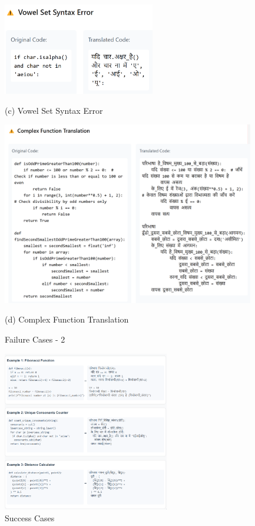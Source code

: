 \documentclass[11pt,a4paper]{article}
\begin{document}
\begin{figure}[!t]
\begin{minipage}{0.95\columnwidth}
    \includegraphics[width=0.7\linewidth,height=4cm,keepaspectratio]{Images/vowel_set_syntax_error.png}
    \vspace{-0.2cm}
    \caption*{(c) Vowel Set Syntax Error}
    \label{fig:vowel-set-syntax-error}
\end{minipage}
\vspace{0.2cm}

\begin{minipage}{0.95\columnwidth}
    \includegraphics[width=1.1\linewidth,height=8cm,keepaspectratio]{Images/complex-function-translation.png}
    \vspace{-0.2cm}
    \caption*{(d) Complex Function Translation}
    \label{fig:complex-function-translation}
\end{minipage}
\vspace{-0.2cm}
\caption{Failure Cases - 2}
\label{fig:failure-cases-2}
\end{figure}
\begin{figure}
    \centering
    \includegraphics[width=0.9\linewidth,height=7cm,keepaspectratio]{Images/success-cases.png}
    \caption{Success Cases}
    \label{fig:success-cases}
\end{figure}
\end{document}
